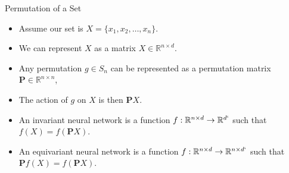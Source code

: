 \documentclass{beamer}
\begin{document}
\begin{frame}{Permutation of a Set}

    \begin{itemize}
        \setlength{\itemsep}{\fill}
        \item Assume our set is $X = \{x_1, x_2, \ldots, x_n\}$.
        \item We can represent $X$ as a matrix $X \in \mathbb{R}^{n \times d}$.
        \item Any permutation $g \in S_n$ can be represented as a permutation matrix $\boldsymbol{P} \in \mathbb{R}^{n \times n}$,
        \item The action of $g$ on $X$ is then $\boldsymbol{P} X$.
        \item An invariant neural network is a function $f: \mathbb{R}^{n \times d} \rightarrow \mathbb{R}^{d`}$ such that $f(X) = f(\boldsymbol{P}X)$.
        \item An equivariant neural network is a function $f: \mathbb{R}^{n \times d} \rightarrow \mathbb{R}^{n \times d`}$ such that $\boldsymbol{P}f(X) = f(\boldsymbol{P}X)$.
    \end{itemize}
    
\end{frame}
\end{document}

